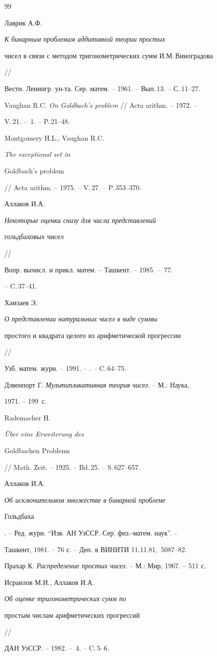 \begin{thebibliography}{99}







Лаврик А.Ф. {\em К бинарным проблемам аддитивной теории простых


чисел в связи с методом тригонометрических сумм И.М.\,Виноградова} //


Вестн. Ленингр. ун-та. Сер. матем. -- 1961. -- Вып.\,13. -- С.\,11--27.




Vaughan R.C. {\em On Goldbach's problem} // Acta arithm. -- 1972. --


V.\,21. -- \No\,1. -- P.\,21--48.




Montgomery H.L., Vaughan R.C. {\em The exceptional set in


Goldbach's problem} // Acta arithm. -- 1975. -- V.\,27. -- P.\,353--370.




Аллаков И.А. {\em Некоторые оценки снизу для числа представлений


гольдбаховых чисел} //


Вопр. вычисл. и прикл. матем. -- Ташкент. -- 1985. -- \No\,77.


-- C.\,37--41.




Хамзаев Э. {\em О представлении натуральных чисел в виде суммы


простого и квадрата целого из арифметической прогрессии} //


Узб. матем. журн. -- 1991. -- . -- C.\,64--75.




Дэвенпорт Г. {\em Мультипликативная теория чисел}. -- М.: Наука,


1971. -- 199~с.




Rademacher H. {\em \"Uber eine Erweiterung des


Goldbachen Problems} // Math. Zeit. -- 1925. -- Bd.\,25. -- S.\,627--657.




Аллаков И.А. {\em Об исключительном множестве в бинарной проблеме


Гольдбаха}. -- Ред. журн. ``Изв. АН УзССР. Сер. физ.-матем. наук''. --


Ташкент, 1981. -- 76 с. -- Деп. в ВИНИТИ 11.11.81, \No\,5087--82.




Прахар К. {\em Распределение простых чисел}. -- М.: Мир, 1967. -- 511 с.




Исраилов М.И., Аллаков И.А. {\em Об оценке тригонометрических сумм по 


простым числам арифметических прогрессий} //


ДАН УзССР. -- 1982. -- \No\,4. -- C.\,5--6.





\end{thebibliography}
